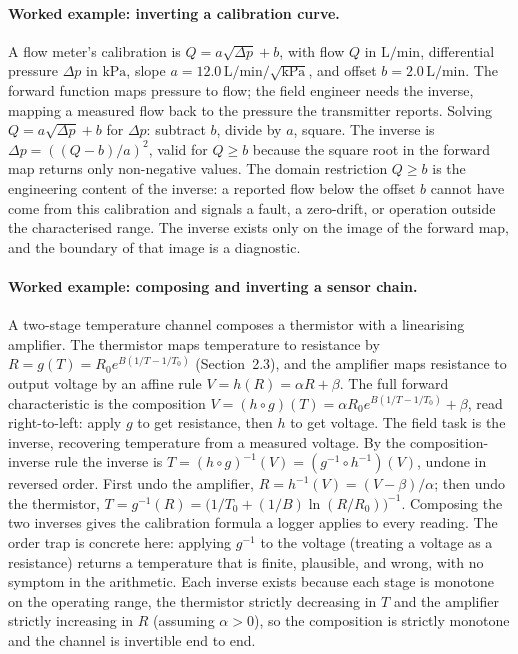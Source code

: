 \paragraph{Worked example: inverting a calibration curve.}
A flow meter's calibration is $Q = a \sqrt{\Delta p} + b$, with flow
$Q$ in $\si{\liter\per\minute}$, differential pressure $\Delta p$ in
$\si{\kilo\pascal}$, slope $a = 12.0\,\si{\liter\per\minute}/\sqrt{
\si{\kilo\pascal}}$, and offset $b = 2.0\,\si{\liter\per\minute}$.
The forward function maps pressure to flow; the field engineer needs
the inverse, mapping a measured flow back to the pressure the
transmitter reports. Solving $Q = a \sqrt{\Delta p} + b$ for $\Delta
p$: subtract $b$, divide by $a$, square. The inverse is $\Delta p =
((Q - b)/a)^{2}$, valid for $Q \geq b$ because the square root in the
forward map returns only non-negative values. The domain restriction
$Q \geq b$ is the engineering content of the inverse: a reported flow
below the offset $b$ cannot have come from this calibration and
signals a fault, a zero-drift, or operation outside the characterised
range. The inverse exists only on the image of the forward map, and
the boundary of that image is a diagnostic.

\paragraph{Worked example: composing and inverting a sensor chain.}
A two-stage temperature channel composes a thermistor with a
linearising amplifier. The thermistor maps temperature to resistance
by $R = g(T) = R_{0} e^{B(1/T - 1/T_{0})}$ (Section~2.3), and the
amplifier maps resistance to output voltage by an affine rule
$V = h(R) = \alpha R + \beta$. The full forward characteristic is the
composition $V = (h \circ g)(T) = \alpha R_{0} e^{B(1/T - 1/T_{0})} +
\beta$, read right-to-left: apply $g$ to get resistance, then $h$ to
get voltage. The field task is the inverse, recovering temperature
from a measured voltage. By the composition-inverse rule the inverse
is $T = (h \circ g)^{-1}(V) = (g^{-1} \circ h^{-1})(V)$, undone in
reversed order. First undo the amplifier, $R = h^{-1}(V) = (V -
\beta)/\alpha$; then undo the thermistor, $T = g^{-1}(R) =
\bigl(1/T_{0} + (1/B)\ln(R/R_{0})\bigr)^{-1}$. Composing the two
inverses gives the calibration formula a logger applies to every
reading. The order trap is concrete here: applying $g^{-1}$ to the
voltage (treating a voltage as a resistance) returns a temperature
that is finite, plausible, and wrong, with no symptom in the
arithmetic. Each inverse exists because each stage is monotone on the
operating range, the thermistor strictly decreasing in $T$ and the
amplifier strictly increasing in $R$ (assuming $\alpha > 0$), so the
composition is strictly monotone and the channel is invertible end to
end.

